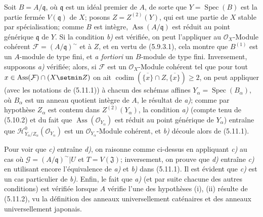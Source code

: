 Soit $B=A/\mathfrak q$, où $\mathfrak q$ est un idéal premier de $A$, de sorte
que $Y=\operatorname{Spec}(B)$ est la partie fermée $V(\mathfrak q)$ de $X$;
posons $Z=Z^{(2)}(Y)$, qui est une partie de $X$ stable par spécialisation;
comme $B$ est intègre, $\operatorname{Ass}(A/\mathfrak q)$ est réduit au point
générique $\mathfrak q$ de $Y$. Si la condition \emph{b)} est vérifiée, on peut
l'appliquer au $\mathcal O_X$-Module cohérent
$\mathcal F=(A/\mathfrak q)^\sim$ et à $Z$, et en vertu de (5.9.3.1), cela
montre que $B^{(1)}$ est un $A$-module de type fini, et \emph{a fortiori} un
$B$-module de type fini. Inversement, supposons \emph{a)} vérifiée; alors, si
$\mathcal F$ est un $\mathcal O_X$-Module cohérent tel que pour tout
$x\in\operatorname{Ass}(\mathcal F)\cap(X\setmin Z)$ on ait
$\operatorname{codim}(\overline{\{x\}}\cap Z,\overline{\{x\}})\geq2$, on peut
appliquer (avec les notations de (5.11.1)) à chacun des schémas affines
$Y_\alpha=\operatorname{Spec}(B_\alpha)$, où $B_\alpha$ est un anneau quotient
intègre de $A$, le résultat de \emph{a)}; comme par hypothèse $Z_\alpha$ est contenu
dans $Z^{(2)}(Y_\alpha)$, la condition \emph{a)} (compte tenu de (5.10.2)
et du fait que $\operatorname{Ass}(\mathcal O_{Y_\alpha})$ est réduit au point
générique de $Y_\alpha$) entraîne que
$\mathcal H^0_{Y_\alpha/Z_\alpha}(\mathcal O_{Y_\alpha})$ est un
$\mathcal O_{Y_\alpha}$-Module cohérent, et \emph{b)} découle alors de (5.11.1).

Pour voir que \emph{c)} entraîne \emph{d)}, on raisonne comme ci-dessus en appliquant \emph{c)} au
cas où $\mathcal G=(A/\mathfrak q)^\sim\vert U$ et $T=V(\mathfrak J)$;
inversement, on prouve que \emph{d)} entraîne \emph{c)} en utilisant encore l'équivalence de
\emph{a)} et \emph{b)} dans (5.11.1). Il est évident que \emph{c)} est un cas particulier de \emph{b)}.
Enfin, le fait que \emph{a)} (et par suite chacune des autres conditions) est vérifiée
lorsque $A$ vérifie l'une des hypothèses (i), (ii) résulte de (5.11.2), vu la
définition des anneaux universellement caténaires et des anneaux
universellement japonais.

